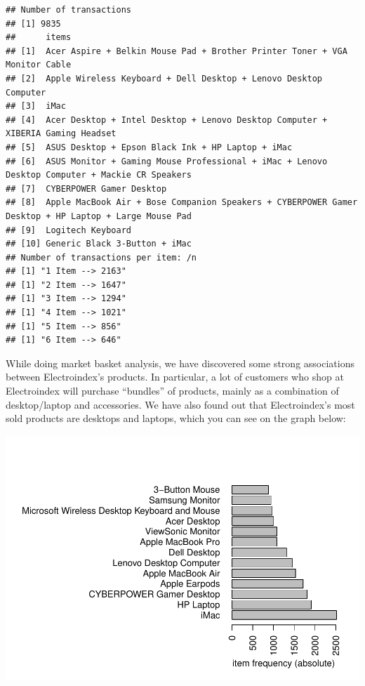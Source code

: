 \documentclass[]{article}
\begin{document}
\begin{verbatim}
## Number of transactions
## [1] 9835
##      items                                                                                               
## [1]  Acer Aspire + Belkin Mouse Pad + Brother Printer Toner + VGA Monitor Cable                          
## [2]  Apple Wireless Keyboard + Dell Desktop + Lenovo Desktop Computer                                    
## [3]  iMac                                                                                                
## [4]  Acer Desktop + Intel Desktop + Lenovo Desktop Computer + XIBERIA Gaming Headset                     
## [5]  ASUS Desktop + Epson Black Ink + HP Laptop + iMac                                                   
## [6]  ASUS Monitor + Gaming Mouse Professional + iMac + Lenovo Desktop Computer + Mackie CR Speakers      
## [7]  CYBERPOWER Gamer Desktop                                                                            
## [8]  Apple MacBook Air + Bose Companion Speakers + CYBERPOWER Gamer Desktop + HP Laptop + Large Mouse Pad
## [9]  Logitech Keyboard                                                                                   
## [10] Generic Black 3-Button + iMac
## Number of transactions per item: /n
## [1] "1 Item --> 2163"
## [1] "2 Item --> 1647"
## [1] "3 Item --> 1294"
## [1] "4 Item --> 1021"
## [1] "5 Item --> 856"
## [1] "6 Item --> 646"
\end{verbatim}

While doing market basket analysis, we have discovered some strong
associations between Electroindex's products. In particular, a lot of
customers who shop at Electroindex will purchase ``bundles'' of
products, mainly as a combination of desktop/laptop and accessories. We
have also found out that Electroindex's most sold products are desktops
and laptops, which you can see on the graph below:

\includegraphics{markdown_report_files/figure-latex/Plots By Items-1.pdf}
\end{document}
